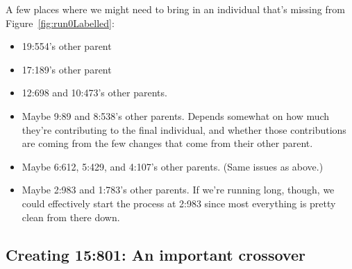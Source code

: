 A few places where we might need to bring in an individual that's 
missing from Figure~\ref{fig:run0Labelled}:
\begin{itemize}
	\item 19:554's other parent
	\item 17:189's other parent
	\item 12:698 and 10:473's other parents.
	\item Maybe 9:89 and 8:538's other parents. Depends somewhat on how much
	they're contributing to the final individual, and whether those 
	contributions are coming from the few changes that come from their other
	parent.
	\item Maybe 6:612, 5:429, and 4:107's other parents. (Same issues as above.)
	\item Maybe 2:983 and 1:783's other parents. If we're running long, though, 
	we could effectively start the process at 2:983 since most everything is
	pretty clean from there down.
\end{itemize}


\subsection{Creating 15:801: An important crossover}
\label{sec:15:801}

